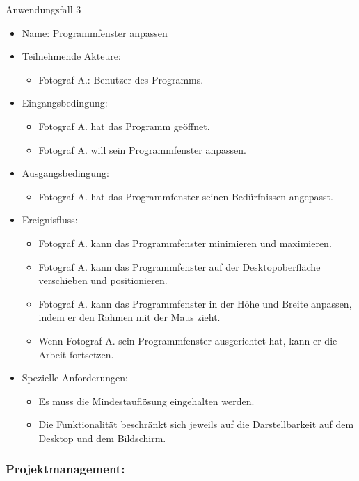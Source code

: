 \begin{itemize}
\begin{description}
	\item[Anwendungsfall 3]
	\end{description}
	
	\begin{itemize}
		\item Name: Programmfenster anpassen
		\item Teilnehmende Akteure:
		\begin{itemize}
			\item	Fotograf A.: Benutzer des Programms.
		\end{itemize}
		\item Eingangsbedingung:
		\begin{itemize}
			\item Fotograf A. hat das Programm geöffnet.
			\item Fotograf A. will sein Programmfenster anpassen.						
		\end{itemize}
		\item Ausgangsbedingung:
		\begin{itemize}
			\item	Fotograf A. hat das Programmfenster seinen Bedürfnissen angepasst.		
		\end{itemize}
		\item Ereignisfluss:	
		\begin{itemize}
			\item Fotograf A. kann das Programmfenster minimieren und maximieren.
			\item Fotograf A. kann das Programmfenster auf der Desktopoberfläche verschieben und positionieren.
			\item Fotograf A. kann das Programmfenster in der Höhe und Breite anpassen, indem er den Rahmen mit der Maus zieht.
			\item Wenn Fotograf A. sein Programmfenster ausgerichtet hat, kann er die Arbeit fortsetzen.
		\end{itemize}
		\item Spezielle Anforderungen:
		\begin{itemize}
			\item	Es muss die Mindestauflösung eingehalten werden.
			\item Die Funktionalität beschränkt sich jeweils auf die Darstellbarkeit auf dem Desktop und dem Bildschirm.
		\end{itemize}
	\end{itemize}	
	
	\subsubsection{Projektmanagement:}
		

\end{itemize}
